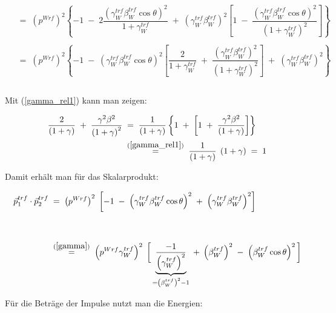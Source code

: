 \documentclass[
a4paper,                                %
twoside,                                %
BCOR1.4cm,                      %
ngerman,                                %
10pt,                           %
headings=normal,                %
headsepline,                    %
clearplainpage, %
final,                                  %
div=14,
parskip=full
]{scrbook}
\begin{document}
\begin{align}
\;&=\;
	\left(p^{Wrf}\right)^{2}\left\{
		-1\;-\;2\dfrac{\left(\gamma_{W}^{trf} 
		\beta_{W}^{trf} \cos \theta\right)^{2}}
		{1 + \gamma_{W}^{trf}}
		\;+\;\left(\gamma_{W}^{trf} \beta_{W}^{trf}\right)^{2}\left[
			1\;-\;\dfrac{\left(\gamma_{W}^{trf} 
			\beta_{W}^{trf} \cos \theta\right)^{2}}
			{\left(1 + \gamma_{W}^{trf}\right)^{2}}
		\right]
	\right\}
\nonumber
\\
\nonumber
\\
\;&=\;
	\left(p^{Wrf}\right)^{2}\left\{
		-1\;-\;\left(\gamma_{W}^{trf} \beta_{W}^{trf} \cos \theta\right)^{2}
		\left[\dfrac{2}{1 + \gamma_{W}^{trf}}
			\;+\;\dfrac{\left(\gamma_{W}^{trf} \beta_{W}^{trf}\right)^{2}}
			{\left(1 + \gamma_{W}^{trf}\right)^{2}}
		\right]\;+\;\left(\gamma_{W}^{trf} \beta_{W}^{trf}\right)^{2}
	\right\}
\nonumber
\\
\nonumber
\\
\nonumber
\end{align}

Mit (\ref{gamma_rel1}) kann man zeigen:

\begin{align}
	\dfrac{2}{\left(1 + \gamma \right)}
	\;+\;\dfrac{\gamma^{2} \beta^{2}}{\left(1 + \gamma \right)^{2}}
\;&=\;
	\dfrac{1}{\left(1 + \gamma \right)} \left\{
		1\;+\;
		\left[
			1\;+\;\dfrac{\gamma^{2} \beta^{2}}{\left(1 + \gamma \right)}
		\right]
	\right\}
\nonumber
\\
\;&\stackrel{\mathrm{(\ref{gamma_rel1})}}=\;
	\dfrac{1}{\left(1 + \gamma \right)}\;\left(1 + \gamma \right)
	\;=\; 1
\label{gamma_rel2}
\end{align}

Damit erh\"alt man f\"ur das Skalarprodukt:

\begin{align}
	\vec{p}_{1}^{trf} \cdot \vec{p}_{2}^{trf}
\;&=\;
	\left(p^{Wrf}\right)^{2}\;
	\left[ 
		-1\;-\;\left( \gamma_{W}^{trf} \beta_{W}^{trf} \cos \theta \right)^{2}
		\;+\;\left( \gamma_{W}^{trf} \beta_{W}^{trf} \right)^{2} 
	\right]
\\
\nonumber
\\
\nonumber
\\
\;&\stackrel{\mathrm{(\ref{gamma})}}=\;
	\left(p^{Wrf} \gamma_{W}^{trf} \right)^{2}\;
	\bigg[ 
		\underbrace{\dfrac{-1}{\left(\gamma_{W}^{trf}\right)^{2}}}
		_{= \left(\beta_{W}^{trf}\right)^{2} - 1}
		\;+\;\left(\beta_{W}^{trf}\right)^{2}
		\;-\;\left( \beta_{W}^{trf} \cos \theta \right)^{2}
	\bigg]
\end{align}

F\"ur die Betr\"age der Impulse nutzt man die Energien:
\end{document}
